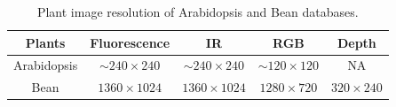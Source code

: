 \begin{table}
\begin{center}
\caption{Plant image resolution of Arabidopsis and Bean databases.}
\label{tab:resolution}
\begin{tabular}{c|c|c|c|c}
      \hline
      Plants     & Fluorescence       & IR        & RGB      & Depth     \\
      \hline
      Arabidopsis &  $\sim$$240\times240$ &  $\sim$$240\times240$  & $\sim$$120\times120$  & NA  \\
      Bean        & $1360\times1024$ & $1360\times1024$ & $1280\times720$ & $320\times240$    \\
      \hline
\end{tabular}
\end{center}
\end{table}
